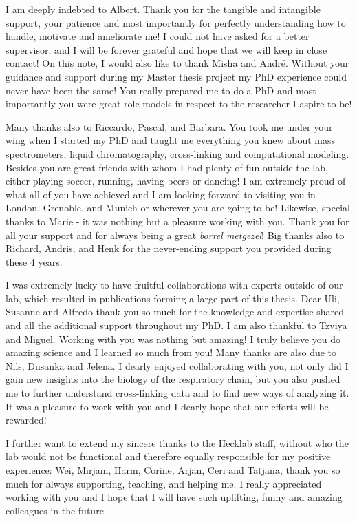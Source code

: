 I am deeply indebted to Albert. Thank you for the tangible and intangible support, your patience and most importantly for perfectly understanding how to handle, motivate and ameliorate me! I could not have asked for a better supervisor, and I will be forever grateful and hope that we will keep in close contact! On this note, I would also like to thank Misha and André. Without your guidance and support during my Master thesis project my PhD experience could never have been the same! You really prepared me to do a PhD and most importantly you were great role models in respect to the researcher I aspire to be!

Many thanks also to Riccardo, Pascal, and Barbara. You took me under your wing when I started my PhD and taught me everything you knew about mass spectrometers, liquid chromatography, cross-linking and computational modeling. Besides you are great friends with whom I had plenty of fun outside the lab, either playing soccer, running, having beers or dancing! I am extremely proud of what all of you have achieved and I am looking forward to visiting you in London, Grenoble, and Munich or wherever you are going to be! Likewise, special thanks to Marie - it was nothing but a pleasure working with you. Thank you for all your support and for always being a great \emph{borrel metgezel}!  Big thanks also to Richard, Andris, and Henk for the never-ending support you provided during these 4 years. \pagebreak

I was extremely lucky to have fruitful collaborations with experts outside of our lab, which resulted in publications forming a large part of this thesis. Dear Uli, Susanne and Alfredo thank you so much for the knowledge and expertise shared and all the additional support throughout my PhD. I am also thankful to Tzviya and Miguel. Working with you was nothing but amazing! I truly believe you do amazing science and I learned so much from you! Many thanks are also due to Nils, Dusanka and Jelena. I dearly enjoyed collaborating with you, not only did I gain new insights into the biology of the respiratory chain, but you also pushed me to further understand cross-linking data and to find new ways of analyzing it. It was a pleasure to work with you and I dearly hope that our efforts will be rewarded!

I further want to extend my sincere thanks to the Hecklab staff, without who the lab would not be functional and therefore equally responsible for my positive experience: Wei, Mirjam, Harm, Corine, Arjan, Ceri and Tatjana, thank you so much for always supporting, teaching, and helping me. I really appreciated working with you and I hope that I will have such uplifting, funny and amazing colleagues in the future.

